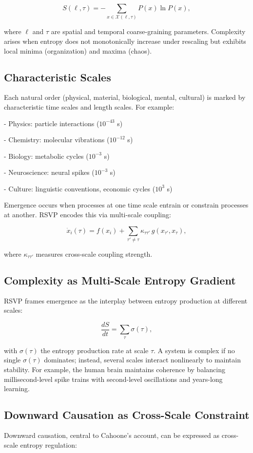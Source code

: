 \documentclass[12pt]{book}
\begin{document}
\[ S(\ell, \tau) = -\sum_{x \in \mathcal{X}(\ell, \tau)} P(x) \ln P(x), \]

where \( \ell \) and \( \tau \) are spatial and temporal coarse-graining parameters. Complexity arises when entropy does not monotonically increase under rescaling but exhibits local minima (organization) and maxima (chaos).

\subsection{Characteristic Scales}
Each natural order (physical, material, biological, mental, cultural) is marked by characteristic time scales and length scales. For example:

- Physics: particle interactions (\( 10^{-43} \) s)

- Chemistry: molecular vibrations (\( 10^{-12} \) s)

- Biology: metabolic cycles (\( 10^{-3} \) s)

- Neuroscience: neural spikes (\( 10^{-3} \) s)

- Culture: linguistic conventions, economic cycles (\( 10^{3} \) s)

Emergence occurs when processes at one time scale entrain or constrain processes at another. RSVP encodes this via multi-scale coupling:

\[ \dot{x}_i(\tau) = f(x_i) + \sum_{\tau' \neq \tau} \kappa_{\tau \tau'} \, g(x_{\tau'}, x_\tau), \]

where \( \kappa_{\tau \tau'} \) measures cross-scale coupling strength.

\subsection{Complexity as Multi-Scale Entropy Gradient}
RSVP frames emergence as the interplay between entropy production at different scales:

\[ \frac{dS}{dt} = \sum_{\tau} \sigma(\tau), \]

with \( \sigma(\tau) \) the entropy production rate at scale \( \tau \). A system is complex if no single \( \sigma(\tau) \) dominates; instead, several scales interact nonlinearly to maintain stability. For example, the human brain maintains coherence by balancing millisecond-level spike trains with second-level oscillations and years-long learning.

\subsection{Downward Causation as Cross-Scale Constraint}
Downward causation, central to Cahoone’s account, can be expressed as cross-scale entropy regulation:
\end{document}
